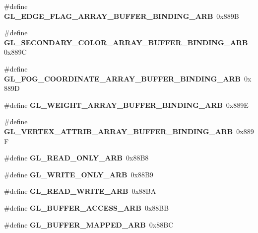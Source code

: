\begin{DoxyCompactItemize}
\item 
\#define {\bfseries G\+L\+\_\+\+E\+D\+G\+E\+\_\+\+F\+L\+A\+G\+\_\+\+A\+R\+R\+A\+Y\+\_\+\+B\+U\+F\+F\+E\+R\+\_\+\+B\+I\+N\+D\+I\+N\+G\+\_\+\+A\+R\+B}~0x889\+B\label{_s_d_l__opengl_8h_aeb36fa5904fd28bfca696c4305bcbe14}

\item 
\#define {\bfseries G\+L\+\_\+\+S\+E\+C\+O\+N\+D\+A\+R\+Y\+\_\+\+C\+O\+L\+O\+R\+\_\+\+A\+R\+R\+A\+Y\+\_\+\+B\+U\+F\+F\+E\+R\+\_\+\+B\+I\+N\+D\+I\+N\+G\+\_\+\+A\+R\+B}~0x889\+C\label{_s_d_l__opengl_8h_a2a696fc689fa84f48d9ed7cb195695b0}

\item 
\#define {\bfseries G\+L\+\_\+\+F\+O\+G\+\_\+\+C\+O\+O\+R\+D\+I\+N\+A\+T\+E\+\_\+\+A\+R\+R\+A\+Y\+\_\+\+B\+U\+F\+F\+E\+R\+\_\+\+B\+I\+N\+D\+I\+N\+G\+\_\+\+A\+R\+B}~0x889\+D\label{_s_d_l__opengl_8h_a28ebc90da902b2a52b2fbf729eb9aba0}

\item 
\#define {\bfseries G\+L\+\_\+\+W\+E\+I\+G\+H\+T\+\_\+\+A\+R\+R\+A\+Y\+\_\+\+B\+U\+F\+F\+E\+R\+\_\+\+B\+I\+N\+D\+I\+N\+G\+\_\+\+A\+R\+B}~0x889\+E\label{_s_d_l__opengl_8h_a77ad736f6cf5a42926e5b55d2e7482f9}

\item 
\#define {\bfseries G\+L\+\_\+\+V\+E\+R\+T\+E\+X\+\_\+\+A\+T\+T\+R\+I\+B\+\_\+\+A\+R\+R\+A\+Y\+\_\+\+B\+U\+F\+F\+E\+R\+\_\+\+B\+I\+N\+D\+I\+N\+G\+\_\+\+A\+R\+B}~0x889\+F\label{_s_d_l__opengl_8h_a2edd2fc34f4005ad63607fec6c1aba3e}

\item 
\#define {\bfseries G\+L\+\_\+\+R\+E\+A\+D\+\_\+\+O\+N\+L\+Y\+\_\+\+A\+R\+B}~0x88\+B8\label{_s_d_l__opengl_8h_afd2a43c89320f8b77dc60bff0f0ff8ed}

\item 
\#define {\bfseries G\+L\+\_\+\+W\+R\+I\+T\+E\+\_\+\+O\+N\+L\+Y\+\_\+\+A\+R\+B}~0x88\+B9\label{_s_d_l__opengl_8h_a18ea1a5fccedc8a14d87c0849b5f47db}

\item 
\#define {\bfseries G\+L\+\_\+\+R\+E\+A\+D\+\_\+\+W\+R\+I\+T\+E\+\_\+\+A\+R\+B}~0x88\+B\+A\label{_s_d_l__opengl_8h_a6081beecc6dc9b99f3b321e029c4757e}

\item 
\#define {\bfseries G\+L\+\_\+\+B\+U\+F\+F\+E\+R\+\_\+\+A\+C\+C\+E\+S\+S\+\_\+\+A\+R\+B}~0x88\+B\+B\label{_s_d_l__opengl_8h_a853f4c607af437774c13275eb0b3e0fd}

\item 
\#define {\bfseries G\+L\+\_\+\+B\+U\+F\+F\+E\+R\+\_\+\+M\+A\+P\+P\+E\+D\+\_\+\+A\+R\+B}~0x88\+B\+C\label{_s_d_l__opengl_8h_a095119080825a1f803a87031750c7217}


\end{DoxyCompactItemize}

